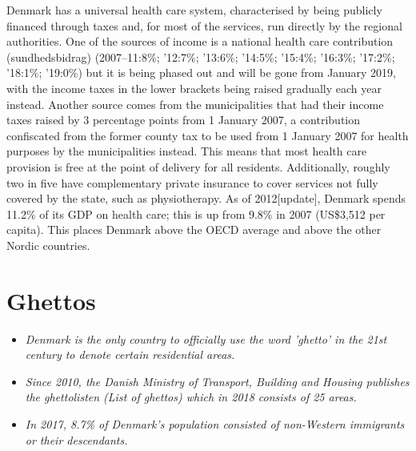 Denmark has a universal health care system, characterised by being
publicly financed through taxes and, for most of the services, run
directly by the regional authorities. One of the sources of income is a
national health care contribution (sundhedsbidrag) (2007--11:8\%;
'12:7\%; '13:6\%; '14:5\%; '15:4\%; '16:3\%; '17:2\%; '18:1\%; '19:0\%)
but it is being phased out and will be gone from January 2019, with the
income taxes in the lower brackets being raised gradually each year
instead. Another source comes from the municipalities that had their
income taxes raised by 3 percentage points from 1 January 2007, a
contribution confiscated from the former county tax to be used from 1
January 2007 for health purposes by the municipalities instead. This
means that most health care provision is free at the point of delivery
for all residents. Additionally, roughly two in five have complementary
private insurance to cover services not fully covered by the state, such
as physiotherapy. As of 2012{[}update{]}, Denmark spends 11.2\% of its
GDP on health care; this is up from 9.8\% in 2007 (US\$3,512 per
capita). This places Denmark above the OECD average and above the other
Nordic countries.

\section{Ghettos}\label{ghettos}

\begin{itemize}
\item
  \emph{Denmark is the only country to officially use the word 'ghetto'
  in the 21st century to denote certain residential areas.}
\item
  \emph{Since 2010, the Danish Ministry of Transport, Building and
  Housing publishes the ghettolisten (List of ghettos) which in 2018
  consists of 25 areas.}
\item
  \emph{In 2017, 8.7\% of Denmark's population consisted of non-Western
  immigrants or their descendants.}
\end{itemize}

